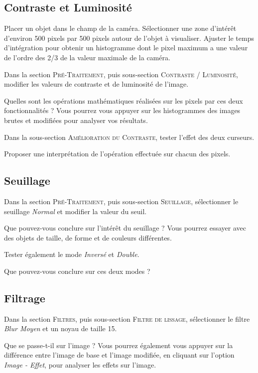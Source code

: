 \documentclass[a4paper,11pt,titlepage]{article} %
\begin{document}
\subsection{Contraste et Luminosité}

\Manip Placer un objet dans le champ de la caméra. Sélectionner une zone d'intérêt d'environ 500 pixels par 500 pixels autour de l'objet à visualiser. Ajuster le temps d'intégration pour obtenir un histogramme dont le pixel maximum a une valeur de l'ordre des 2/3 de la valeur maximale de la caméra. 

\Manip Dans la section \textsc{Pré-Traitement}, puis sous-section \textsc{Contraste / Luminosité}, modifier les valeurs de contraste et de luminosité de l'image.

\Quest Quelles sont les opérations mathématiques réalisées sur les pixels par ces deux fonctionnalités ? Vous pourrez vous appuyer sur les histogrammes des images brutes et modifiées pour analyser vos résultats.

\Manip Dans la sous-section \textsc{Amélioration du Contraste}, tester l'effet des deux curseurs.

\Quest Proposer une interprétation de l'opération effectuée sur chacun des pixels.


\subsection{Seuillage}

\Manip Dans la section \textsc{Pré-Traitement}, puis sous-section \textsc{Seuillage}, sélectionner le seuillage \textsl{Normal} et modifier la valeur du seuil.

\Quest Que pouvez-vous conclure sur l'intérêt du seuillage ? Vous pourrez essayer avec des objets de taille, de forme et de couleurs différentes.

\Manip Tester également le mode \textsl{Inversé} et \textsl{Double}.

\Quest Que pouvez-vous conclure sur ces deux modes ?
 

\subsection{Filtrage}

\Manip Dans la section \textsc{Filtres}, puis sous-section \textsc{Filtre de lissage}, sélectionner le filtre \textsl{Blur Moyen} et un noyau de taille 15.

\Quest Que se passe-t-il sur l'image ? Vous pourrez également vous appuyer sur la différence entre l'image de base et l'image modifiée, en cliquant sur l'option \textsl{Image - Effet}, pour analyser les effets sur l'image.
\end{document}
